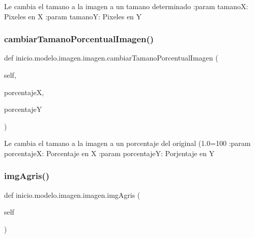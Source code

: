 \begin{DoxyVerb}Le cambia el tamano a la imagen a un tamano determinado
:param tamanoX: Pixeles en X
:param tamanoY: Pixeles en Y
\end{DoxyVerb}
 \mbox{\label{classinicio_1_1modelo_1_1imagen_1_1imagen_a07f410a7549699fdc65be4f8f822f79a}} 
\subsubsection{\texorpdfstring{cambiar\+Tamano\+Porcentual\+Imagen()}{cambiarTamanoPorcentualImagen()}}
{\footnotesize\ttfamily def inicio.\+modelo.\+imagen.\+imagen.\+cambiar\+Tamano\+Porcentual\+Imagen (\begin{DoxyParamCaption}\item[{}]{self,  }\item[{}]{porcentajeX,  }\item[{}]{porcentajeY }\end{DoxyParamCaption})}

\begin{DoxyVerb}Le cambia el tamano a la imagen a un porcentaje del original (1.0=100%
:param porcentajeX: Porcentaje en X 
:param porcentajeY: Porjentaje en Y
\end{DoxyVerb}
 \mbox{\label{classinicio_1_1modelo_1_1imagen_1_1imagen_ab3913b41763b116d6d452d27dbe93d1f}} 
\subsubsection{\texorpdfstring{img\+Agris()}{imgAgris()}}
{\footnotesize\ttfamily def inicio.\+modelo.\+imagen.\+imagen.\+img\+Agris (\begin{DoxyParamCaption}\item[{}]{self }\end{DoxyParamCaption})}

